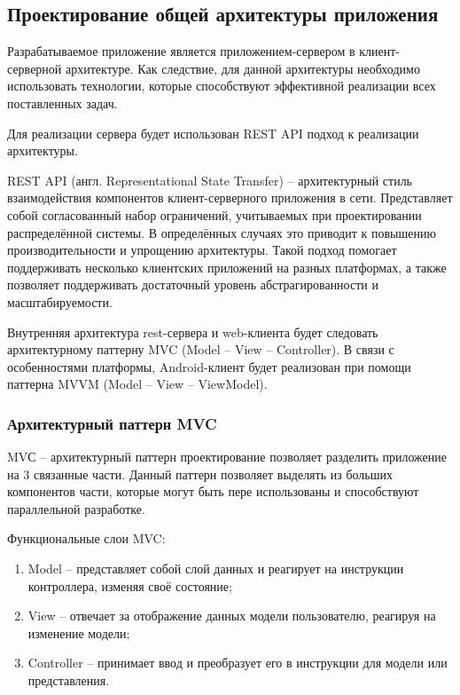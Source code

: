 \subsection{Проектирование общей архитектуры приложения}\label{subsec:2-design-architecure}\indent

Разрабатываемое приложение является приложением-сервером в клиент-серверной архитектуре.
Как следствие, для данной архитектуры необходимо использовать технологии, которые способствуют эффективной реализации всех поставленных задач.


Для реализации сервера будет использован REST API подход к реализации архитектуры.

REST API (англ. Representational State Transfer) – архитектурный стиль взаимодействия компонентов клиент-серверного приложения в сети.
Представляет собой согласованный набор ограничений, учитываемых при проектировании распределённой системы.
В определённых случаях это приводит к повышению производительности и упрощению архитектуры.
Такой подход помогает поддерживать несколько клиентских приложений на разных платформах, а также позволяет поддерживать достаточный уровень абстрагированности и масштабируемости.

Внутренняя архитектура rest-сервера и web-клиента будет следовать архитектурному паттерну MVC (Model – View – Controller).
В связи с особенностями платформы, Android-клиент будет реализован при помощи паттерна MVVM (Model – View – ViewModel).

\subsubsection{Архитектурный паттерн MVC}\indent


MVС – архитектурный паттерн проектирование позволяет разделить приложение на 3 связанные части.
Данный паттерн позволяет выделять из больших компонентов части, которые могут быть пере использованы и способствуют параллельной разработке.

Функциональные слои MVC:
\begin{enumerate}
    \item Model – представляет собой слой данных и реагирует на инструкции контроллера, изменяя своё состояние;
    \item View – отвечает за отображение данных модели пользователю, реагируя на изменение модели;
    \item Controller – принимает ввод и преобразует его в инструкции для модели или представления.
\end{enumerate}

